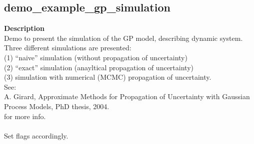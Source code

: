 \subsection*{demo\_example\_gp\_simulation} \label{fun:demo_example_gp_simulation}

\textbf{Description}
\\ Demo to present the simulation of the GP model, describing dynamic
 system. Three different simulations are presented:
\\ (1) ``naive'' simulation (without propagation of uncertainty)
\\ (2) ``exact'' simulation (anayltical propagation of uncertainty)
\\ (3) simulation with numerical (MCMC) propagation of uncertainty.
\\ See:
\\   A. Girard, Approximate Methods for Propagation of Uncertainty
   with Gaussian Process Models, PhD thesis, 2004.
\\ for more info.
\\
\\ Set flags accordingly.
